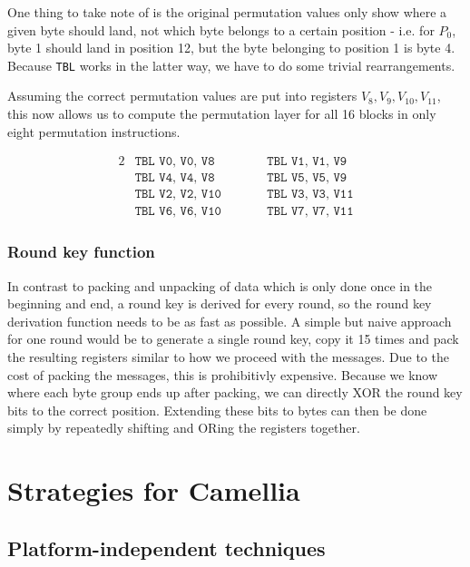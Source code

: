 One thing to take note of is the original permutation values only show where a
given byte should land, not which byte belongs to a certain position - i.e. for
$P_0$, byte 1 should land in position 12, but the byte belonging to position 1
is byte 4. Because \texttt{TBL} works in the latter way, we have to do some
trivial rearrangements.

Assuming the correct permutation values are put into registers
$V_8,V_9,V_{10},V_{11}$, this now allows us to compute the permutation layer
for all 16 blocks in only eight permutation instructions.

\begin{alignat*}{2}
    &\texttt{TBL V0, V0, V8}\qquad &&\texttt{TBL V1, V1, V9} \\
    &\texttt{TBL V4, V4, V8}\qquad &&\texttt{TBL V5, V5, V9} \\
    &\texttt{TBL V2, V2, V10}\qquad &&\texttt{TBL V3, V3, V11} \\
    &\texttt{TBL V6, V6, V10}\qquad &&\texttt{TBL V7, V7, V11}
\end{alignat*}

\subsubsection{Round key function}

In contrast to packing and unpacking of data which is only done once in the
beginning and end, a round key is derived for every round, so the round key
derivation function needs to be as fast as possible. A simple but naive
approach for one round would be to generate a single round key, copy it 15
times and pack the resulting registers similar to how we proceed with the
messages. Due to the cost of packing the messages, this is prohibitivly
expensive. Because we know where each byte group ends up after packing, we can
directly XOR the round key bits to the correct position. Extending these bits
to bytes can then be done simply by repeatedly shifting and ORing the registers
together.

\section{Strategies for Camellia}

\subsection{Platform-independent techniques}

